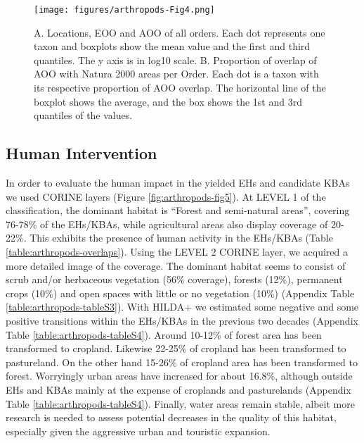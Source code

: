    \begin{figure}[ht]
      \centering
      \texttt{[image: figures/arthropods-Fig4.png]}
      \caption[AOO, EOO and N2K overlaps per order]{A. Locations, EOO and AOO of all orders. Each dot represents one taxon and boxplots show the mean value and the first and third quantiles. The y axis is in log10 scale. B. Proportion of overlap of AOO with Natura 2000 areas per Order. Each dot is a taxon with its respective proportion of AOO overlap. The horizontal line of the boxplot shows the average, and the box shows the 1st and 3rd quantiles of the values.}
      \label{fig:arthropods-fig4}
   \end{figure}

    \subsection{Human Intervention}
    \label{subsec:arthropods-human-intervention}


In order to evaluate the human impact in the yielded EHs and candidate KBAs we
used CORINE layers (Figure \ref{fig:arthropods-fig5}). At LEVEL 1 of the classification, the dominant
habitat is “Forest and semi-natural areas”, covering ~ 76-78\% of the EHs/KBAs,
while agricultural areas also display coverage of 20-22\%. This exhibits the
presence of human activity in the EHs/KBAs (Table \ref{table:arthropods-overlaps}). Using the LEVEL 2 CORINE
layer, we acquired a more detailed image of the coverage. The dominant habitat
seems to consist of scrub and/or herbaceous vegetation  (56\% coverage),
forests (12\%), permanent crops (10\%) and open spaces with little or
no vegetation (10\%) (Appendix Table \ref{table:arthropods-tableS3}). With HILDA+ we
estimated some negative and some positive transitions within the EHs/KBAs in
the previous two decades (Appendix Table \ref{table:arthropods-tableS4}). Around 10-12\% of
forest area has been transformed to cropland. Likewise 22-25\% of cropland has
been transformed to pastureland. On the other hand 15-26\% of cropland area has
been transformed to forest. Worryingly urban areas have increased for about 16.8\%,
although outside EHs and KBAs mainly at the expense of croplands and
pasturelands (Appendix Table \ref{table:arthropods-tableS4}). Finally, water areas remain
stable, albeit more research is needed to assess potential decreases in the
quality of this habitat, especially given the aggressive urban and touristic expansion.


